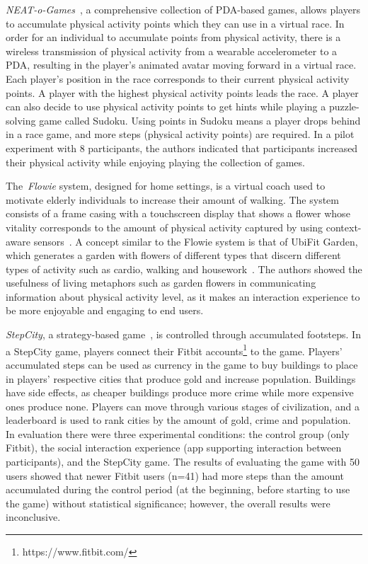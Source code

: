 \emph{{NEAT-o-Games}}~\citep{fujiki2008neat}, a comprehensive collection of PDA-based games, allows players to accumulate physical activity points which they can use in a virtual race. In order for an individual to accumulate points from physical activity, there is a wireless transmission of physical activity from a wearable accelerometer to a PDA, resulting in the player's animated avatar moving forward in a virtual race. Each player's position in the race corresponds to their current physical activity points. A player with the highest physical activity points leads the race. A player can also decide to use physical activity points to get hints while playing a puzzle-solving game called Sudoku. Using points in Sudoku means a player drops behind in a race game, and more steps (physical activity points) are required. In a pilot experiment with 8 participants, the authors indicated that participants increased their physical activity while enjoying playing the collection of games. 

The~\emph{Flowie} system, designed for home settings, is a virtual coach used to motivate elderly individuals to increase their amount of walking. The system consists of a frame casing with a touchscreen display that shows a flower whose vitality corresponds to the amount of physical activity captured by using context-aware sensors~\citep{albaina2009flowie}. A concept similar to the Flowie system is that of UbiFit Garden, which generates a garden with flowers of different types that discern different types of activity such as cardio, walking and housework~\citep{klasnja2009:using}. The authors showed the usefulness of living metaphors such as garden flowers in communicating information about physical activity level, as it makes an interaction experience to be more enjoyable and engaging to end users.

\emph{StepCity}, a strategy-based game~\citep{walsh2014stepcity}, is controlled through accumulated footsteps. In a StepCity game, players connect their Fitbit accounts\footnote{https://www.fitbit.com/} to the game. Players' accumulated steps can be used as currency in the game to buy buildings to place in players' respective cities that produce gold and increase population. Buildings have side effects, as cheaper buildings produce more crime while more expensive ones produce none. Players can move through various stages of civilization, and a leaderboard is used to rank cities by the amount of gold, crime and population. In evaluation there were three experimental conditions: the control group (only Fitbit), the social interaction experience (app supporting interaction between participants), and the StepCity game. The results of evaluating the game with 50 users showed that newer Fitbit users (n=41) had more steps than the amount accumulated during the control period (at the beginning, before starting to use the game) without statistical significance; however, the overall results were inconclusive.  

